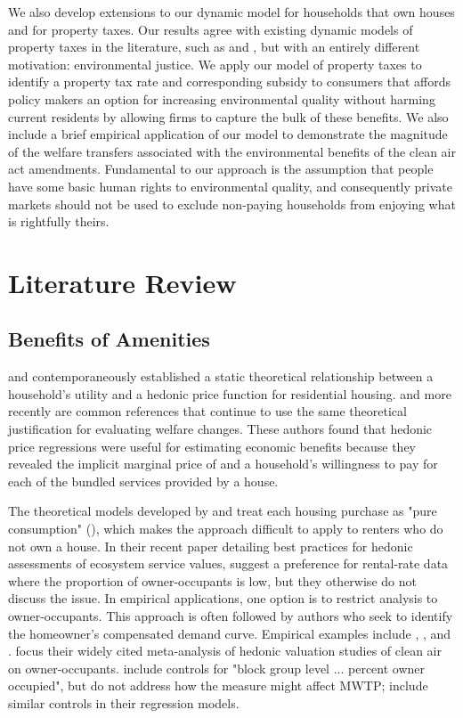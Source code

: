 \documentclass[ecta,nameyear,draft]{econsocart}
\theoremstyle{plain}
\theoremstyle{remark}
\begin{document}
We also develop extensions to our dynamic model for households that own houses and for property taxes. Our results agree with existing dynamic models of property taxes in the literature, such as \cite{freeman80} and \cite{poterba84}, but with an entirely different motivation: environmental justice. We apply our model of property taxes to identify a  property tax rate and corresponding subsidy to consumers that affords policy makers an option for increasing environmental quality without harming current residents by allowing firms to capture the bulk of these benefits. We also include a brief empirical application of our model to demonstrate the magnitude of the welfare transfers associated with the environmental benefits of the clean air act amendments. Fundamental to our approach is the assumption that people have some basic human rights to environmental quality, and consequently private markets should not be used to exclude non-paying households from enjoying what is rightfully theirs.


\section{Literature Review}

\subsection{Benefits of Amenities}

\cite{rosen74} and \cite{freeman74} contemporaneously established a static theoretical relationship between a household's utility and a hedonic price function for residential housing. \cite{freeman99} and more recently \cite{freeman14} are common references that continue to use the same theoretical justification for evaluating welfare changes. These authors found that hedonic price regressions were useful for estimating economic benefits because they revealed the implicit marginal price of and a household's willingness to pay for each of the bundled services provided by a house. 

The theoretical models developed by \cite{rosen74} and \cite{freeman74} treat each housing purchase as "pure consumption" (\cite{rosen74}), which makes the approach difficult to apply to renters who do not own a house. In their recent paper detailing best practices for hedonic assessments of ecosystem service values, \cite{bishop20} suggest a preference for rental-rate data where the proportion of owner-occupants is low, but they otherwise do not discuss the issue. In empirical applications, one option is to restrict analysis to owner-occupants. This approach is often followed by authors who seek to identify the homeowner's compensated demand curve. Empirical examples include \cite{palmquist84}, \cite{zabelkiel00}, and \cite{chaygreenstone05}. \cite{smithhuang95} focus their widely cited meta-analysis of hedonic valuation studies of clean air on owner-occupants. \cite{kuminoffpope14} include controls for "block group level ... percent owner occupied", but do not address how the measure might affect MWTP; \cite{chaygreenstone05} include similar controls in their regression models.
 
\end{document}
